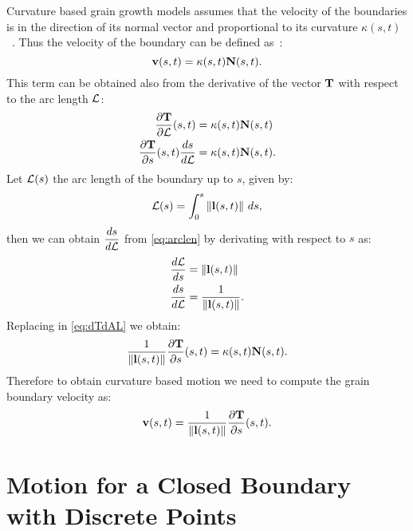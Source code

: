 Curvature based grain growth models assumes that the velocity of the boundaries is in the direction of its normal vector and proportional to its curvature $\kappa(s,t)$~\cite{Kinderlehrer2006}. Thus the velocity of the boundary can be defined as~\cite{thomascalculus}:
\begin{equation}
    \vel(s,t) = \kappa(s,t)\N(s,t). %
    \nonumber
\end{equation}
This term can be obtained also from the derivative of the vector $\mathbf{T}$ with respect to the arc length $\mathcal{L}$:
\begin{align}
    \dfrac{\partial \mathbf{T}}{\partial \mathcal{L}}(s,t)  &= \kappa(s,t)\mathbf{N}(s,t) \nonumber\\
    \dfrac{\partial \mathbf{T}}{\partial s}(s,t) \dfrac{ds}{d\mathcal{L}} &=\kappa(s,t)\mathbf{N}(s,t). \label{eq:dTdAL}
\end{align}
Let $\mathcal{L}(s)$ the arc length of the boundary up to $s$, given by:
\begin{equation}
    \mathcal{L}(s) = \int_0^{s} \left\lVert\mathbf{l}(s,t)\right\rVert\, ds,
    \label{eq:arclen}
\end{equation}
then we can obtain $\dfrac{ds}{d\mathcal{L}}$ from \eqref{eq:arclen} by derivating with respect to $s$ as:
\begin{align*}
    \frac{d\mathcal{L}}{ds} &= \left\lVert\mathbf{l}(s,t)\right\rVert \\
    \frac{ds}{d\mathcal{L}} &= \frac{1}{\left\lVert\mathbf{l}(s,t)\right\rVert}.
\end{align*}
Replacing in \eqref{eq:dTdAL} we obtain:
\begin{equation}
    \dfrac{1}{\left\lVert\mathbf{l}(s,t)\right\rVert} \dfrac{\partial \mathbf{T}}{\partial s}(s,t) = \kappa(s,t)\mathbf{N}(s,t).
    \label{eq:curvresult}
\end{equation}
Therefore to obtain curvature based motion we need to compute the grain boundary velocity as:
\begin{equation} \mathbf{v}(s,t) = \frac{1}{\left\lVert\mathbf{l}(s,t)\right\rVert}\dfrac{\partial \mathbf{T}}{\partial s}(s,t). \label{eq:curvvelocity}
\end{equation}

\section{Motion for a Closed Boundary with Discrete Points}

